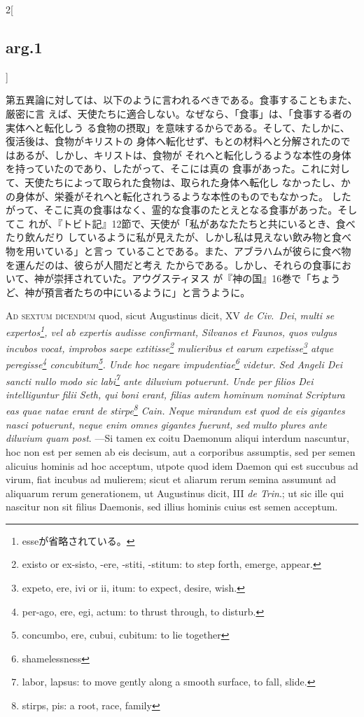 \documentclass[paper=a4paper,fontsize=10pt,jafontsize=9pt,titlepage]{jlreq}
\begin{document}
\begin{paracol}{2}[\subsection{arg.1}]
\switchcolumn

第五異論に対しては、以下のように言われるべきである。食事することもまた、厳密に言
えば、天使たちに適合しない。なぜなら、「食事」は、「食事する者の実体へと転化しう
る食物の摂取」を意味するからである。そして、たしかに、復活後は、食物がキリストの
身体へ転化せず、もとの材料へと分解されたのではあるが、しかし、キリストは、食物が
それへと転化しうるような本性の身体を持っていたのであり、したがって、そこには真の
食事があった。これに対して、天使たちによって取られた食物は、取られた身体へ転化し
なかったし、かの身体が、栄養がそれへと転化されうるような本性のものでもなかった。
したがって、そこに真の食事はなく、霊的な食事のたとえとなる食事があった。そしてこ
れが、『トビト記』12節で、天使が「私があなたたちと共にいるとき、食べたり飲んだり
しているように私が見えたが、しかし私は見えない飲み物と食べ物を用いている」と言っ
ていることである。また、アブラハムが彼らに食べ物を運んだのは、彼らが人間だと考え
たからである。しかし、それらの食事において、神が崇拝されていた。アウグスティヌス
が『神の国』16巻で「ちょうど、神が預言者たちの中にいるように」と言うように。

\switchcolumn*[\subsection{ad.6}]

{\scshape Ad sextum dicendum} quod, sicut Augustinus dicit, XV {\itshape de
Civ.~Dei}, {\itshape multi se expertos\footnote{esseが省略されている。}, vel ab
expertis audisse confirmant, Silvanos et Faunos, quos vulgus incubos vocat,
improbos saepe extitisse\footnote{existo or ex-sisto, -ere, -stiti, -stitum: to
step forth, emerge, appear.}  mulieribus et earum expetisse\footnote{expeto,
ere, ivi or ii, itum: to expect, desire, wish.} atque
peregisse\footnote{per-ago, ere, egi, actum: to thrust through, to disturb.}
concubitum\footnote{concumbo, ere, cubui, cubitum: to lie together}. Unde hoc
negare impudentiae\footnote{shamelessness} videtur. Sed Angeli Dei sancti nullo
modo sic labi\footnote{labor, lapsus: to move gently along a smooth surface, to
fall, slide.} ante diluvium potuerunt. Unde per filios Dei intelliguntur filii
Seth, qui boni erant, filias autem hominum nominat Scriptura eas quae natae
erant de stirpe\footnote{stirps, pis: a root, race, family} Cain. Neque mirandum
est quod de eis gigantes nasci potuerunt, neque enim omnes gigantes fuerunt, sed
multo plures ante diluvium quam post}. ---Si tamen ex coitu Daemonum aliqui
interdum nascuntur, hoc non est per semen ab eis decisum, aut a corporibus
assumptis, sed per semen alicuius hominis ad hoc acceptum, utpote quod idem
Daemon qui est succubus ad virum, fiat incubus ad mulierem; sicut et aliarum
rerum semina assumunt ad aliquarum rerum generationem, ut Augustinus dicit, III
{\itshape de Trin}.; ut sic ille qui nascitur non sit filius Daemonis, sed
illius hominis cuius est semen acceptum.


\end{paracol}
\end{document}

